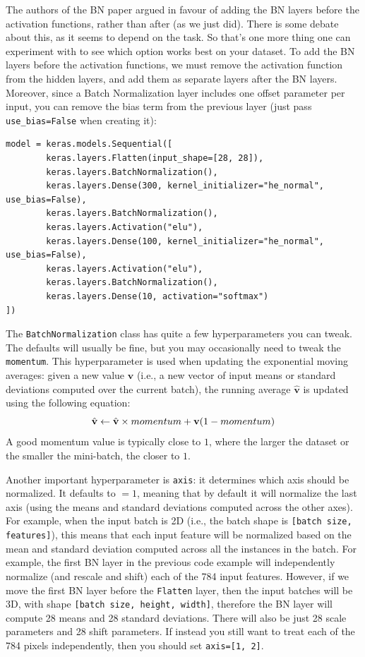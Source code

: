 \documentclass[12pt, letterpaper]{article}
\theoremstyle{definition}
\DeclarePairedDelimiter\autobracket{(}{)}
\newcommand{\br}[1]{\autobracket*{#1}}
\let\cd\lstinline
\begin{document}
The authors of the BN paper argued in favour of adding the BN layers before the activation functions, rather than after (as we just did). There is some debate about this, as it seems to depend on the task. So that's one more thing one can experiment with to see which option works best on your dataset. To add the BN layers before the activation functions, we must remove the activation function from the hidden layers, and add them as separate layers after the BN layers. Moreover, since a Batch Normalization layer includes one offset parameter per input, you can remove the bias term from the previous layer (just pass \cd+use_bias=False+ when creating it):
\begin{lstlisting}
model = keras.models.Sequential([
        keras.layers.Flatten(input_shape=[28, 28]),
        keras.layers.BatchNormalization(),
        keras.layers.Dense(300, kernel_initializer="he_normal", use_bias=False),
        keras.layers.BatchNormalization(),
        keras.layers.Activation("elu"),
        keras.layers.Dense(100, kernel_initializer="he_normal", use_bias=False),
        keras.layers.Activation("elu"),
        keras.layers.BatchNormalization(),
        keras.layers.Dense(10, activation="softmax")
])
\end{lstlisting}
The \cd+BatchNormalization+ class has quite a few hyperparameters you can tweak. The defaults will usually be fine, but you may occasionally need to tweak the \cd+momentum+. This hyperparameter is used when updating the exponential moving averages: given a new value $\mathbf{v}$ (i.e., a new vector of input means or standard deviations computed over the current batch), the running average $\hat{\mathbf{v}}$ is updated using the following equation:
\begin{equation}
\hat{\mathbf{v}} \leftarrow \hat{\mathbf{v}} \times momentum + \mathbf{v} \br{1-momentum}
\end{equation}
A good momentum value is typically close to $1$, where the larger the dataset or the smaller the mini-batch, the closer to $1$.

Another important hyperparameter is \cd+axis+: it determines which axis should be normalized. It defaults to $=1$, meaning that by default it will normalize the last axis (using the means and standard deviations computed across the other axes). For example, when the input batch is 2D (i.e., the batch shape is \cd+[batch size, features]+), this means that each input feature will be normalized based on the mean and standard deviation computed across all the instances in the batch. For example, the first BN layer in the previous code example will independently normalize (and rescale and shift) each of the 784 input features. However, if we move the first BN layer before the \cd+Flatten+ layer, then the input batches will be 3D, with shape \cd+[batch size, height, width]+, therefore the BN layer will compute 28 means and 28 standard deviations. There will also be just 28 scale parameters and 28 shift parameters. If instead you still want to treat each of the 784 pixels independently, then you should set \cd+axis=[1, 2]+.
\end{document}
